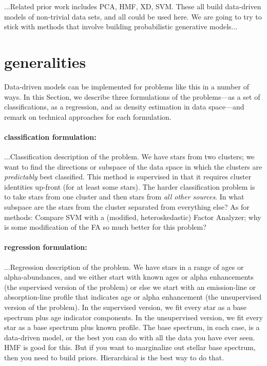 \documentclass[12pt, preprint]{aastex}
\newcommand{\sectionname}{Section}
\begin{document}
...Related prior work includes PCA, HMF, XD, SVM.  These all build
data-driven models of non-trivial data sets, and all could be used
here.  We are going to try to stick with methods that involve building
probabilistic generative models...

\section{generalities}

Data-driven models can be implemented for problems like this in a
number of ways.  In this \sectionname, we describe three formulations
of the problems---as a set of classifications, as a regression, and as
density estimation in data space---and remark on technical approaches
for each formulation.

\paragraph{classification formulation:}
...Classification description of the problem.  We have stars from two
clusters; we want to find the directions or subspace of the data space
in which the clusters are \emph{predictably} best classified.  This
method is supervised in that it requires cluster identities up-front
(for at least some stars).  The harder classification problem is to
take stars from one cluster and then stars from \emph{all other
  sources}.  In what subspace are the stars from the cluster separated
from everything else?  As for methods: Compare SVM with a (modified,
heteroskedastic) Factor Analyzer; why is some modification of the FA
so much better for this problem?

\paragraph{regression formulation:}
...Regression description of the problem.  We have stars in a range of
ages or alpha-abundances, and we either start with known ages or alpha
enhancements (the supervised version of the problem) or else we start
with an emission-line or absorption-line profile that indicates age or
alpha enhancement (the unsupervised version of the problem).  In the
supervised version, we fit every star as a base spectrum plus age
indicator components.  In the unsupervised version, we fit every star
as a base spectrum plus known profile.  The base spectrum, in each
case, is a data-driven model, or the best you can do with all the data
you have ever seen.  HMF is good for this.  But if you want to
marginalize out stellar base spectrum, then you need to build priors.
Hierarchical is the best way to do that.
\end{document}
